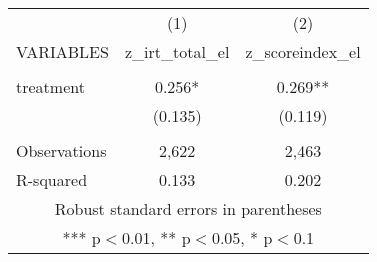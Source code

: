\documentclass[]{article}
\begin{document}
\begin{tabular}{lcc} \hline
 & (1) & (2) \\
VARIABLES & z\_irt\_total\_el & z\_scoreindex\_el \\ \hline
 &  &  \\
treatment & 0.256* & 0.269** \\
 & (0.135) & (0.119) \\
 &  &  \\
Observations & 2,622 & 2,463 \\
 R-squared & 0.133 & 0.202 \\ \hline
\multicolumn{3}{c}{ Robust standard errors in parentheses} \\
\multicolumn{3}{c}{ *** p$<$0.01, ** p$<$0.05, * p$<$0.1} \\
\end{tabular}
\end{document}
